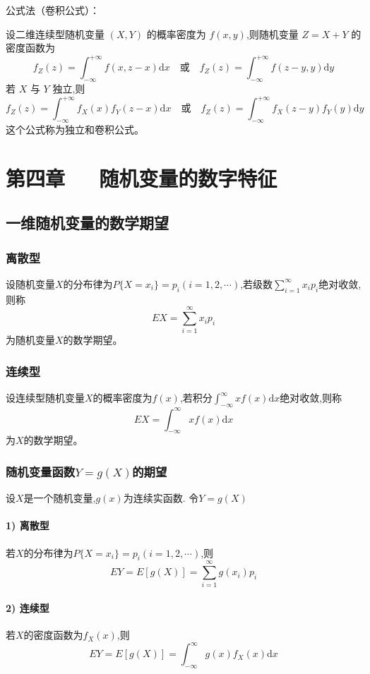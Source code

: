 \documentclass[UTF8]{ctexart}
\theoremstyle{remark}
\begin{document}
		公式法（卷积公式）：
		
		设二维连续型随机变量 \((X, Y)\) 的概率密度为 \(f(x, y)\),则随机变量 \(Z = X + Y\) 的密度函数为
		\[
		f_Z(z) = \int_{-\infty}^{+\infty} f(x, z - x) \mathrm{d}x \quad \text{或} \quad f_Z(z) = \int_{-\infty}^{+\infty} f(z - y, y) \mathrm{d}y
		\]
		若 \(X\) 与 \(Y\) 独立,则
		\[
		f_Z(z) = \int_{-\infty}^{+\infty} f_X(x)f_Y(z - x) \mathrm{d}x \quad \text{或} \quad f_Z(z) = \int_{-\infty}^{+\infty} f_X(z - y)f_Y(y) \mathrm{d}y
		\]
		这个公式称为独立和卷积公式。
		
		\section{第四章~~~随机变量的数字特征}
		
		\subsection{一维随机变量的数学期望}
		\subsubsection{离散型}
		设随机变量\(X\)的分布律为\(P\{X = x_i\} = p_i (i = 1,2,\cdots)\),若级数\(\sum_{i = 1}^{\infty} x_i p_i\)绝对收敛,则称
		\[
		EX=\sum_{i = 1}^{\infty} x_i p_i
		\]
		为随机变量\(X\)的数学期望。
		
		\subsubsection{连续型}
		设连续型随机变量\(X\)的概率密度为\(f(x)\),若积分\(\int_{-\infty}^{\infty} x f(x) \mathrm{d}x\)绝对收敛,则称
		\[
		EX=\int_{-\infty}^{\infty} x f(x) \mathrm{d}x
		\]
		为\(X\)的数学期望。
		
		\subsubsection{随机变量函数\(Y = g(X)\)的期望}
		设\(X\)是一个随机变量,\(g(x)\)为连续实函数. 令\(Y = g(X)\)
		
		\paragraph{1) 离散型}
		若\(X\)的分布律为\(P\{X = x_i\} = p_i (i = 1,2,\cdots)\),则
		\[
		EY = E[g(X)]=\sum_{i = 1}^{\infty} g(x_i) p_i
		\]
		
		\paragraph{2) 连续型}
		若\(X\)的密度函数为\(f_X(x)\),则
		\[
		EY = E[g(X)]=\int_{-\infty}^{\infty} g(x) f_X(x) \mathrm{d}x
		\]
		
\end{document}
